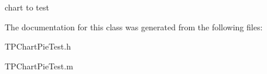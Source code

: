 chart to test 

The documentation for this class was generated from the following files:\begin{CompactItemize}
\item 
TPChartPieTest.h\item 
TPChartPieTest.m\end{CompactItemize}
